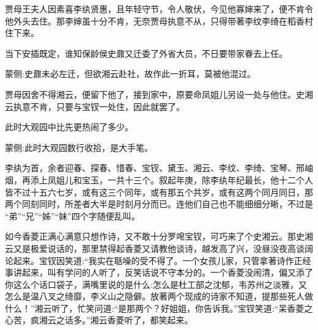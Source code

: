 \begin{parag}
    贾母王夫人因素喜李纨贤惠，且年轻守节，令人敬伏，今见他寡婶来了，便不肯令他外头去住。那李婶虽十分不肯，无奈贾母执意不从，只得带著李纹李绮在稻香村住下来。
\end{parag}


\begin{parag}
    当下安插既定，谁知保龄侯史鼐又迁委了外省大员，不日要带家眷去上任。\begin{note}蒙侧:史鼐未必左迁，但欲湘云赴社，故作此一折耳，莫被他混过。\end{note}贾母因舍不得湘云，便留下他了，接到家中，原要命凤姐儿另设一处与他住。史湘云执意不肯，只要与宝钗一处住，因此就罢了。
\end{parag}


\begin{parag}
    此时大观园中比先更热闹了多少。\begin{note}蒙侧:此时大观园数行收拾，是大手笔。\end{note}李纨为首，余者迎春、探春、惜春、宝钗、黛玉、湘云、李纹、李绮、宝琴、邢岫烟，再添上凤姐儿和宝玉，一共十三个。叙起年庚，除李纨年纪最长，他十二个人皆不过十五六七岁，或有这三个同年，或有那五个共岁，或有这两个同月同日，那两个同刻同时，所差者大半是时刻月分而已。连他们自己也不能细细分晰，不过是 “弟”“兄”“姊”“妹”四个字随便乱叫。
\end{parag}


\begin{parag}
    如今香菱正满心满意只想作诗，又不敢十分罗唣宝钗，可巧来了个史湘云。那史湘云又是极爱说话的，那里禁得起香菱又请教他谈诗，越发高了兴，没昼没夜高谈阔论起来。宝钗因笑道:“我实在聒噪的受不得了。一个女孩儿家，只管拿著诗作正经事讲起来，叫有学问的人听了，反笑话说不守本分的。一个香菱没闹清，偏又添了你这么个话口袋子，满嘴里说的是什么:怎么是杜工部之沈郁，韦苏州之淡雅，又怎么是温八叉之绮靡，李义山之隐僻。放著两个现成的诗家不知道，提那些死人做什么！”湘云听了，忙笑问道:“是那两个？好姐姐，你告诉我。”宝钗笑道:“呆香菱之心苦，疯湘云之话多。”湘云香菱听了，都笑起来。
\end{parag}


